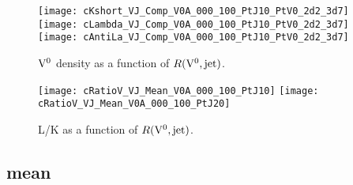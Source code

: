 \begin{figure}[t]
\begin{center}
\texttt{[image: cKshort\_VJ\_Comp\_V0A\_000\_100\_PtJ10\_PtV0\_2d2\_3d7]}
\texttt{[image: cLambda\_VJ\_Comp\_V0A\_000\_100\_PtJ10\_PtV0\_2d2\_3d7]}
\texttt{[image: cAntiLa\_VJ\_Comp\_V0A\_000\_100\_PtJ10\_PtV0\_2d2\_3d7]}
\caption{${\rm V}^{0}$ density as a function of $R({\rm V}^{0},{\rm jet})$.}
\label{fig:c07LKrhoR}
\end{center}
\end{figure}

\begin{figure}[t]
\begin{center}
\texttt{[image: cRatioV\_VJ\_Mean\_V0A\_000\_100\_PtJ10]}
\texttt{[image: cRatioV\_VJ\_Mean\_V0A\_000\_100\_PtJ20]}
\caption{L/K as a function of $R({\rm V}^{0},{\rm jet})$.}
\label{fig:c07LKratioR}
\end{center}
\end{figure}

\subsection{mean \pt}


